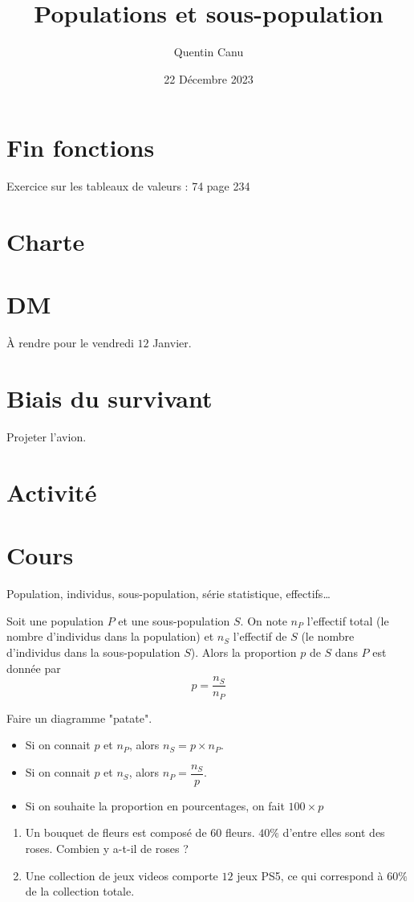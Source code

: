 \documentclass{article}
\title{Populations et sous-population}
\date{22 Décembre 2023}
\author{Quentin Canu}
\begin{document}
\section{Fin fonctions}
Exercice sur les tableaux de valeurs : 74 page 234
\section{Charte}
\section{DM}
\`A rendre pour le vendredi $12$ Janvier.
\section{Biais du survivant}
Projeter l'avion.
\section{Activité}
\section{Cours}
\begin{vocabulary}
Population, individus, sous-population, série statistique, effectifs\dots
\end{vocabulary}
\begin{definition}
Soit une population $P$ et une sous-population $S$. On note $n_P$ l'effectif total (le nombre d'individus dans la population) et $n_S$ l'effectif de $S$ (le nombre d'individus dans la sous-population $S$). Alors la proportion $p$ de $S$ dans $P$ est donnée par
\begin{equation*}
p = \dfrac{n_S}{n_P}
\end{equation*}
\end{definition}
Faire un diagramme "patate".
\begin{itemize}
\item Si on connait $p$ et $n_P$, alors $n_S = p \times n_P$.
\item Si on connait $p$ et $n_S$, alors $n_P = \dfrac{n_S}{p}$.
\item Si on souhaite la proportion en pourcentages, on fait $100 \times p$
\end{itemize}
\begin{example}
\begin{enumerate}
\item Un bouquet de fleurs est composé de $60$ fleurs. $40\%$ d'entre elles sont des roses. Combien y a-t-il de roses ?
\item Une collection de jeux videos comporte $12$ jeux PS5, ce qui correspond à $60\%$ de la collection totale.
\end{enumerate}
\end{example}
\end{document}
